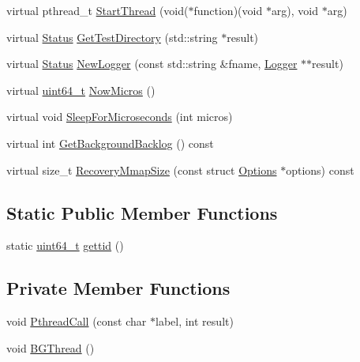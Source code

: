 \begin{DoxyCompactItemize}
virtual pthread\+\_\+t \hyperlink{classleveldb_1_1anonymous__namespace_02env__posix_8cc_03_1_1_posix_env_a989962b97dee560f3d370f150fb3282f}{Start\+Thread} (void($\ast$function)(void $\ast$arg), void $\ast$arg)
\item 
virtual \hyperlink{classleveldb_1_1_status}{Status} \hyperlink{classleveldb_1_1anonymous__namespace_02env__posix_8cc_03_1_1_posix_env_a882de2201480d5d6f98c007a77b36334}{Get\+Test\+Directory} (std\+::string $\ast$result)
\item 
virtual \hyperlink{classleveldb_1_1_status}{Status} \hyperlink{classleveldb_1_1anonymous__namespace_02env__posix_8cc_03_1_1_posix_env_a74acc573ab20ad7994fc3c96a462553b}{New\+Logger} (const std\+::string \&fname, \hyperlink{classleveldb_1_1_logger}{Logger} $\ast$$\ast$result)
\item 
virtual \hyperlink{stdint_8h_aaa5d1cd013383c889537491c3cfd9aad}{uint64\+\_\+t} \hyperlink{classleveldb_1_1anonymous__namespace_02env__posix_8cc_03_1_1_posix_env_a01909b63859454be697b26ca0759e705}{Now\+Micros} ()
\item 
virtual void \hyperlink{classleveldb_1_1anonymous__namespace_02env__posix_8cc_03_1_1_posix_env_a674235663d8253fc77021bd5de189742}{Sleep\+For\+Microseconds} (int micros)
\item 
virtual int \hyperlink{classleveldb_1_1anonymous__namespace_02env__posix_8cc_03_1_1_posix_env_a3777b122c3e1ae74d31b4c4d87a3ea7f}{Get\+Background\+Backlog} () const 
\item 
virtual size\+\_\+t \hyperlink{classleveldb_1_1anonymous__namespace_02env__posix_8cc_03_1_1_posix_env_a5f6d71a99846671144913b0043ed954e}{Recovery\+Mmap\+Size} (const struct \hyperlink{structleveldb_1_1_options}{Options} $\ast$options) const 
\end{DoxyCompactItemize}
\subsection*{Static Public Member Functions}
\begin{DoxyCompactItemize}
\item 
static \hyperlink{stdint_8h_aaa5d1cd013383c889537491c3cfd9aad}{uint64\+\_\+t} \hyperlink{classleveldb_1_1anonymous__namespace_02env__posix_8cc_03_1_1_posix_env_a07fd18b1c79eab2f2991b8b62d335c3e}{gettid} ()
\end{DoxyCompactItemize}
\subsection*{Private Member Functions}
\begin{DoxyCompactItemize}
\item 
void \hyperlink{classleveldb_1_1anonymous__namespace_02env__posix_8cc_03_1_1_posix_env_a1ee30b79d2859d02a999efc63692cee4}{Pthread\+Call} (const char $\ast$label, int result)
\item 
void \hyperlink{classleveldb_1_1anonymous__namespace_02env__posix_8cc_03_1_1_posix_env_a4981af562d0fc302a1c9b61cf69db1f9}{B\+G\+Thread} ()
\end{DoxyCompactItemize}
